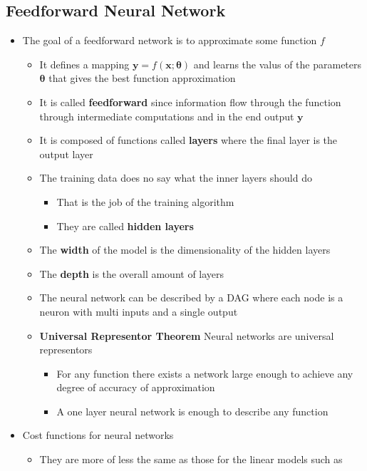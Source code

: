 \documentclass[a4, english]{article}
\begin{document}
\subsection{Feedforward Neural Network}
\begin{itemize}
	\item The goal of a feedforward network is to approximate some function $f$ 
  \begin{itemize}
  	\item It defines a mapping $\pmb y = f(\pmb x; \pmb \theta)$ and learns the valus of the parameters $\pmb \theta$ that gives the best function approximation
    \item It is called \textbf{feedforward} since information flow through the function through intermediate computations and in the end output $\pmb y$
    \item It is composed of functions called \textbf{layers} where the final layer is the output layer
    \item The training data does no say what the inner layers should do
    \begin{itemize}
    	\item That is the job of the training algorithm
      \item They are called \textbf{hidden layers} 
    \end{itemize}
    \item The \textbf{width} of the model is the dimensionality of the hidden layers
    \item The \textbf{depth} is the overall amount of layers
    \item The neural network can be described by a DAG where each node is a neuron with multi inputs and a single output 
  \item \textbf{Universal Representor Theorem} Neural networks are universal representors
    \begin{itemize}
      \item For any function there exists a network large enough to achieve any degree of accuracy of approximation 
    	\item A one layer neural network is enough to describe any function 
    \end{itemize}
  \end{itemize} 
  \item Cost functions for neural networks  
  \begin{itemize}
  	\item They are more of less the same as those for the linear models such as 

\end{itemize}
\end{itemize}
\end{document}
